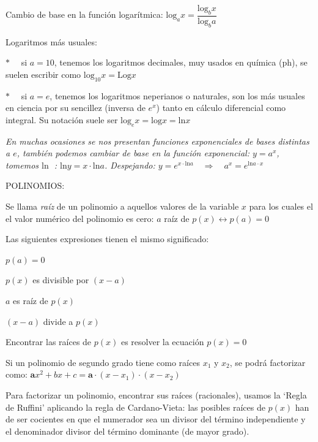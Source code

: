 Cambio de base en la función logarítmica: $\mathrm{log}_a x = \dfrac {\mathrm{log}_b x}{\mathrm{log}_b a}$

Logaritmos más usuales:  

$* \quad$ si $a=10$, tenemos los logaritmos decimales, muy usados en química (ph), se suelen escribir como $\mathrm{log}_{10} x = \mathrm{Log} x$

$* \quad$ si $a=e$, tenemos los logaritmos neperianos  o naturales, son los más usuales en ciencia por su sencillez (inversa de $e^x$) tanto en cálculo diferencial como integral. Su notación suele ser $\mathrm{log}_e x= \mathrm{log} x =\mathrm{ln} x$

\textit{En muchas ocasiones se nos presentan funciones exponenciales de bases distintas a $e$, también podemos cambiar de base en la función exponencial: $y=a^x$, tomemos $\mathrm{ln}\;$ : $\mathrm{ln}y=x\cdot \mathrm{ln} a$. Despejando: $y=e^{ x\cdot \mathrm{ln} a } \quad \Rightarrow \quad a^x=e^{  \mathrm{ln} a \cdot x}$ }

POLINOMIOS:

Se llama \emph{raíz} de un polinomio a aquellos valores de la variable $x$ para los cuales el el valor numérico del polinomio es cero: $a$ raíz de $p(x) \leftrightarrow p(a)=0$

Las siguientes expresiones tienen el mismo significado:


	\hspace{10mm}  $p(a)=0$
	
	\hspace{10mm}  $p(x)$ es divisible por $(x-a)$
	 
	 \hspace{10mm} $a$ es raíz de $p(x)$
	 
	 \hspace{10mm} $(x-a)$ divide a $p(x)$
	 
	 \hspace{10mm} Encontrar las raíces de $p(x)$ es resolver la ecuación $p(x)=0$

Si un polinomio de segundo grado tiene como raíces $x_1$ y $x_2$, se podrá factorizar como: $\textbf{a} x^2+bx+c=\textbf{a}\cdot (x-x_1) \cdot (x-x_2)$

Para factorizar un polinomio, encontrar sus raíces (racionales), usamos la `Regla de Ruffini' aplicando la regla de Cardano-Vieta: las posibles raíces de $p(x)$ han de ser cocientes en que el numerador sea un divisor del término independiente y el denominador divisor del término dominante (de mayor grado).

